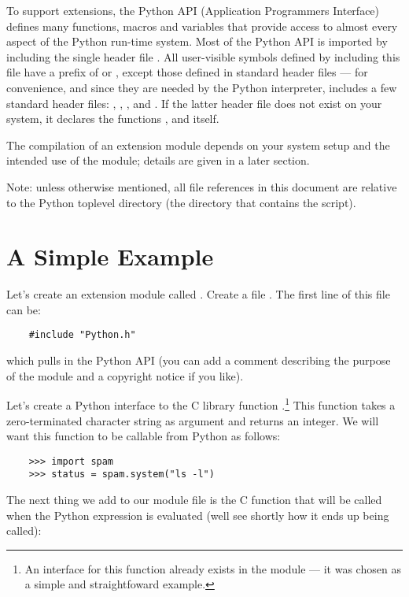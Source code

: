 To support extensions, the Python API (Application Programmers
Interface) defines many functions, macros and variables that provide
access to almost every aspect of the Python run-time system.
Most of the Python API is imported by including the single header file
.  All user-visible symbols defined by including this
file have a prefix of  or , except those defined in
standard header files --- for convenience, and since they are needed by
the Python interpreter,  includes a few standard
header files: , , ,
and .  If the latter header file does not exist on
your system, it declares the functions , 
and  itself.

The compilation of an extension module depends on your system setup
and the intended use of the module; details are given in a later
section.

Note: unless otherwise mentioned, all file references in this
document are relative to the Python toplevel directory
(the directory that contains the  script).


\section{A Simple Example}

Let's create an extension module called .  Create a file
.  The first line of this file can be:

\begin{verbatim}
    #include "Python.h"
\end{verbatim}

which pulls in the Python API (you can add a comment describing the
purpose of the module and a copyright notice if you like).

Let's create a Python interface to the C library function
.\footnote{An interface for this function already
exists in the  module --- it was chosen as a simple and
straightfoward example.}  This function takes a zero-terminated
character string as argument and returns an integer.  We will want
this function to be callable from Python as follows:

\begin{verbatim}
    >>> import spam
    >>> status = spam.system("ls -l")
\end{verbatim}

The next thing we add to our module file is the C function that will
be called when the Python expression 
is evaluated (well see shortly how it ends up being called):

